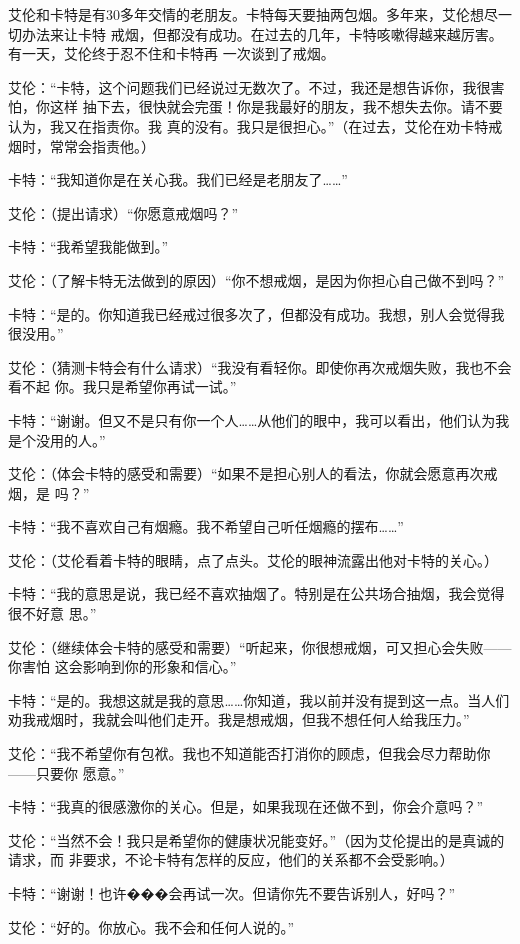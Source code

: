 \documentclass{ctexart}
\renewenvironment{quotation}{\setlength{\parskip}{0.5em}\setstretch{1.5}\kaishu\zihao{-5}\setlength{\parindent}{1em}}{\vspace{1em}}
\begin{document}
艾伦和卡特是有30多年交情的老朋友。卡特每天要抽两包烟。多年来，艾伦想尽一切办法来让卡特
戒烟，但都没有成功。在过去的几年，卡特咳嗽得越来越厉害。有一天，艾伦终于忍不住和卡特再
一次谈到了戒烟。

\begin{quotation}
	艾伦：``卡特，这个问题我们已经说过无数次了。不过，我还是想告诉你，我很害怕，你这样
	抽下去，很快就会完蛋！你是我最好的朋友，我不想失去你。请不要认为，我又在指责你。我
	真的没有。我只是很担心。''（在过去，艾伦在劝卡特戒烟时，常常会指责他。）

	卡特：``我知道你是在关心我。我们已经是老朋友了\ldots\ldots''

	艾伦：（提出请求）``你愿意戒烟吗？''

	卡特：``我希望我能做到。''

	艾伦：（了解卡特无法做到的原因）``你不想戒烟，是因为你担心自己做不到吗？''

	卡特：``是的。你知道我已经戒过很多次了，但都没有成功。我想，别人会觉得我很没用。''

	艾伦：（猜测卡特会有什么请求）``我没有看轻你。即使你再次戒烟失败，我也不会看不起
	你。我只是希望你再试一试。''

	卡特：``谢谢。但又不是只有你一个人\ldots\ldots 从他们的眼中，我可以看出，他们认为我
	是个没用的人。''

	艾伦：（体会卡特的感受和需要）``如果不是担心别人的看法，你就会愿意再次戒烟，是
	吗？''

	卡特：``我不喜欢自己有烟瘾。我不希望自己听任烟瘾的摆布\ldots\ldots''

	艾伦：（艾伦看着卡特的眼睛，点了点头。艾伦的眼神流露出他对卡特的关心。）

	卡特：``我的意思是说，我已经不喜欢抽烟了。特别是在公共场合抽烟，我会觉得很不好意
	思。''

	艾伦：（继续体会卡特的感受和需要）``听起来，你很想戒烟，可又担心会失败------你害怕
	这会影响到你的形象和信心。''

	卡特：``是的。我想这就是我的意思\ldots\ldots 你知道，我以前并没有提到这一点。当人们
	劝我戒烟时，我就会叫他们走开。我是想戒烟，但我不想任何人给我压力。''

	艾伦：``我不希望你有包袱。我也不知道能否打消你的顾虑，但我会尽力帮助你------只要你
	愿意。''

	卡特：``我真的很感激你的关心。但是，如果我现在还做不到，你会介意吗？''

	艾伦：``当然不会！我只是希望你的健康状况能变好。''（因为艾伦提出的是真诚的请求，而
	非要求，不论卡特有怎样的反应，他们的关系都不会受影响。）

	卡特：``谢谢！也许���会再试一次。但请你先不要告诉别人，好吗？''

	艾伦：``好的。你放心。我不会和任何人说的。''
\end{quotation}
\end{document}
